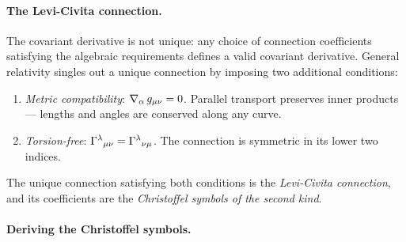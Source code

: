 \paragraph{The Levi-Civita connection.}

The covariant derivative is not unique: any choice of connection coefficients
satisfying the algebraic requirements defines a valid covariant derivative.
General relativity singles out a unique connection by imposing two additional
conditions:
%
\begin{enumerate}
  \item \emph{Metric compatibility}: $\nabla_{\alpha}\, g_{\mu\nu} = 0$.  Parallel
    transport preserves inner products --- lengths and angles are conserved
    along any curve.
  \item \emph{Torsion-free}: $\Gamma^{\lambda}{}_{\mu \nu} =
    \Gamma^{\lambda}{}_{\nu \mu}$.  The connection is symmetric in its lower
    two indices.
\end{enumerate}
%
The unique connection satisfying both conditions is the \emph{Levi-Civita
connection}, and its coefficients are the \emph{Christoffel symbols of the
second kind}.

\paragraph{Deriving the Christoffel symbols.}

